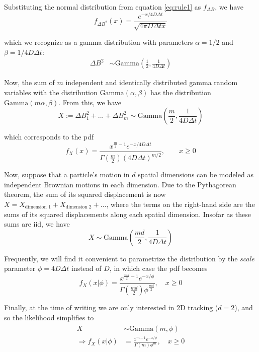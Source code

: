 \documentclass{article}
\begin{document}
Substituting the normal distribution from equation \ref{eq:rule1} as $f_{\Delta B}$,
we have
\[
    f_{\Delta B^{2}}(x) = \frac{ e^{-x / 4 D \Delta t} }{ \sqrt{4 \pi D \Delta t x} }
\]

which we recognize as a gamma distribution with parameters $\alpha = 1/2$ and
$\beta = 1 / 4 D \Delta t$:
\begin{align*}
    \Delta B^{2} &\sim \text{Gamma} \left( \frac{1}{2}, \frac{1}{4 D \Delta t} \right)
\end{align*}

Now, the sum of $m$ independent and identically distributed gamma random variables
with the distribution $\text{Gamma} \left( \alpha, \beta \right)$ has the distribution
$\text{Gamma} \left( m \alpha, \beta \right)$. From this, we have
\begin{equation}
    X := \Delta B_{1}^{2} + ... + \Delta B_{m}^{2} \sim \text{Gamma} \left(
        \frac{m}{2}, \frac{1}{4 D \Delta t}
    \right)
\end{equation}

which corresponds to the pdf
\begin{equation}
    f_{X}(x) = \frac{x^{\frac{m}{2}-1} e^{-x / 4 D \Delta t}}{\Gamma \left( \frac{m}{2} \right) \left( 4 D \Delta t \right)^{m/2}}, \qquad x \geq 0
\end{equation}

Now, suppose that a particle's motion in $d$ spatial dimensions can be
modeled as independent Brownian motions in each dimension. Due to the Pythagorean
theorem, the sum of its squared displacement is now
$X = X_{\text{dimension 1}} + X_{\text{dimension 2}} + ...$, where
the terms on the right-hand side are the sums of its squared displacements along
each spatial dimension. Insofar as these sums are iid, we have
\begin{equation}\label{eq:brownian_likelihood}
    X \sim \text{Gamma} \left( \frac{md}{2}, \frac{1}{4 D \Delta t} \right)
\end{equation}

Frequently, we will find it convenient to parametrize the distribution by
the \emph{scale} parameter $\phi = 4 D \Delta t$ instead of $D$,
in which case the pdf becomes
\begin{equation}\label{eq:brownian_likelihood_2}
    f_{X}(x | \phi) = \frac{x^{\frac{md}{2} - 1} e^{-x / \phi}}{\Gamma \left( \frac{md}{2} \right) \phi^{\frac{md}{2}}}, \quad x \geq 0
\end{equation}

Finally, at the time of writing we are only interested in 2D tracking ($d=2$),
and so the likelihood simplifies to
\begin{align}\begin{split}\label{eq:brownian_likelihood_3}
    X &\sim \text{Gamma} \left( m, \phi \right) \\
    \Rightarrow f_{X}(x | \phi) &= \frac{x^{m-1} e^{-x/\phi}}{\Gamma (m) \phi^{m}}, \quad x \geq 0
\end{split}\end{align}
\end{document}

